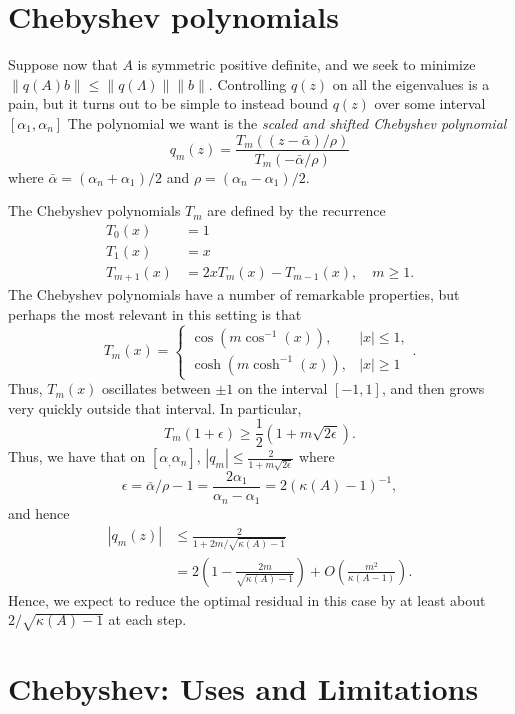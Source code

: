 \documentclass[12pt, leqno]{article} %
\begin{document}
\section{Chebyshev polynomials}

Suppose now that $A$ is symmetric positive definite, and we seek to
minimize $\|q(A) b\| \leq \|q(\Lambda)\| \|b\|$.  Controlling $q(z)$
on all the eigenvalues is a pain, but it turns out to be simple to
instead bound $q(z)$ over some interval $[\alpha_1, \alpha_n]$
The polynomial we want is the {\em scaled and shifted Chebyshev polynomial}
\[
  q_m(z) =
  \frac{T_m\left( (z-\bar{\alpha})/\rho \right)}
       {T_m\left( -\bar{\alpha}/\rho \right)}
\]
where $\bar{\alpha} = (\alpha_n + \alpha_1)/2$ and
$\rho = (\alpha_n-\alpha_1)/2$.

The Chebyshev polynomials $T_m$ are defined by the recurrence
\begin{align*}
  T_0(x) &= 1 \\
  T_1(x) &= x \\
  T_{m+1}(x) &= 2x T_m(x) - T_{m-1}(x), \quad m \geq 1.
\end{align*}
The Chebyshev polynomials have a number of remarkable properties, but
perhaps the most relevant in this setting is that
\[
  T_m(x) =
  \begin{cases}
    \cos(m \cos^{-1}(x)), & |x| \leq 1, \\
    \cosh(m \cosh^{-1}(x)), &|x| \geq 1
  \end{cases}.
\]
Thus, $T_m(x)$ oscillates between $\pm 1$ on the interval $[-1,1]$,
and then grows very quickly outside that interval.  In particular,
\[
  T_{m}(1 + \epsilon) \geq \frac{1}{2} (1+m\sqrt{2\epsilon}).
\]
Thus, we have that on $[\alpha_, \alpha_n]$,
$|q_m| \leq \frac{2}{1+m\sqrt{2\epsilon}}$
where
\[
  \epsilon = \bar{\alpha}/\rho-1
  = \frac{2\alpha_1}{\alpha_n-\alpha_1}
  = 2 \left( \kappa(A)-1 \right)^{-1},
\]
and hence
\begin{align*}
  |q_m(z)|
  &\leq \frac{2}{1+2m/\sqrt{\kappa(A)-1}} \\
  &= 2\left( 1- \frac{2m}{\sqrt{\kappa(A)-1}}\right) + O\left(\frac{m^2}{\kappa(A-1)}\right).
\end{align*}
Hence, we expect to reduce the optimal residual in this case
by at least about $2/\sqrt{\kappa(A)-1}$ at each step.

\section{Chebyshev: Uses and Limitations}
\end{document}
